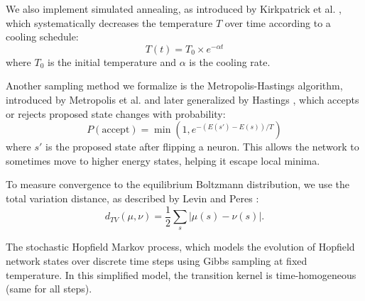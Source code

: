 \begin{definition}\label{SimulatedAnnealing}
\leanok
We also implement simulated annealing, as introduced by Kirkpatrick et al. \cite{kirk},
which systematically decreases the temperature $T$ over time according to a cooling schedule:
$$T(t) = T_0 \times e^{-\alpha t}$$ where $T_0$ is the initial temperature 
and $\alpha$ is the cooling rate. 
\end{definition}

\begin{definition}\label{Metropolis-Hastings}
\leanok
Another sampling method we formalize is the Metropolis-Hastings algorithm, 
introduced by Metropolis et al. \cite{metropolis} 
and later generalized by Hastings \cite{hastings}, which accepts or rejects 
proposed state changes with probability:
$$P(\text{accept}) = \min(1, e^{-(E(s') - E(s))/T})$$
where $s'$ is the proposed state after flipping a neuron. 
This allows the network to sometimes move to higher energy states, helping it escape local minima.
\end{definition}

\begin{definition}\label{Total variation}
\leanok
To measure convergence to the equilibrium Boltzmann distribution,
 we use the total variation distance, as described by Levin and Peres \cite{levin} : 
$$d_{TV}(\mu, \nu) = \frac{1}{2} \sum_s |\mu(s) - \nu(s)|.$$
\end{definition}

\begin{definition}\label{stochasticHopfieldMarkovProcess}
\leanok
The stochastic Hopfield Markov process, which models the evolution of Hopfield network states
over discrete time steps using Gibbs sampling at fixed temperature.
In this simplified model, the transition kernel is time-homogeneous (same for all steps).
\end{definition}